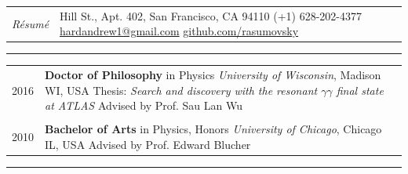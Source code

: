 \documentclass{letter}
\begin{document}

\begin{tabular}{p{}p{}}
  \hfill \newline \href{https://ch.linkedin.com/in/andrew-hard-25b690a5}{\Huge{\color{Maroon}{Andrew Hard}}} \newline \LARGE{\textit{R\'{e}sum\'{e}}} \newline
  &
  \hfill \newline 1 Hill St., Apt. 402, San Francisco, CA 94110 \newline
  (+1) 628-202-4377 \newline
  \href{mailto:hardandrew1@gmail.com}{hardandrew1@gmail.com} \newline
  \href{https://github.com/rasumovsky}{github.com/rasumovsky}\\
\end{tabular}



\begin{flushleft}
  \Large{\textsc{\textbf{\color{Maroon}{Education}}}}
  \vspace{1pt}  %
  \hrule
\end{flushleft}

  \begin{tabular}{p{}p{}}
  2016
  &
  \textbf{Doctor of Philosophy} in Physics \newline 
  \textit{University of Wisconsin}, Madison WI, USA \newline
  Thesis: \textit{Search and discovery with the resonant $\gamma\gamma$ final state at ATLAS} \newline
  Advised by Prof. Sau Lan Wu \\
  \\

  2010 
  & 
  \textbf{Bachelor of Arts} in Physics, Honors \newline 
  \textit{University of Chicago}, Chicago IL, USA \newline
  Advised by Prof. Edward Blucher 
\end{tabular}



\begin{flushleft}
  \Large{\textsc{\textbf{\color{Maroon}{Experience}}}}
  \vspace{1pt} %
  \hrule
\end{flushleft}
\end{document}
